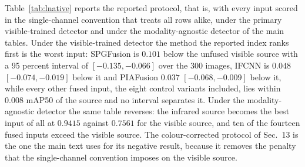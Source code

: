 \documentclass[preprint,12pt,a4paper]{elsarticle}
\begin{document}
Table~\ref{tab:lnative} reports the reported protocol, that is, with every input scored
in the single-channel convention that treats all rows alike, under the primary
visible-trained detector and under the modality-agnostic detector of the main tables.
Under the visible-trained detector the method the reported index ranks first is the
worst input: SPGFusion is $0.101$ below the unfused visible source with a 95 percent
interval of $[-0.135,-0.066]$ over the 300 images, IFCNN is $0.048$
$[-0.074,-0.019]$ below it and PIAFusion $0.037$ $[-0.068,-0.009]$ below it, while
every other fused input, the eight control variants included, lies within $0.008$
mAP50 of the source and no interval separates it. Under the modality-agnostic detector
the same table reverses: the infrared source becomes the best input of all at $0.9415$
against $0.7561$ for the visible source, and ten of the fourteen fused inputs exceed
the visible source. The colour-corrected protocol of Sec.~13 is the one the main text
uses for its negative result, because it removes the penalty that the single-channel
convention imposes on the visible source.
\end{document}
